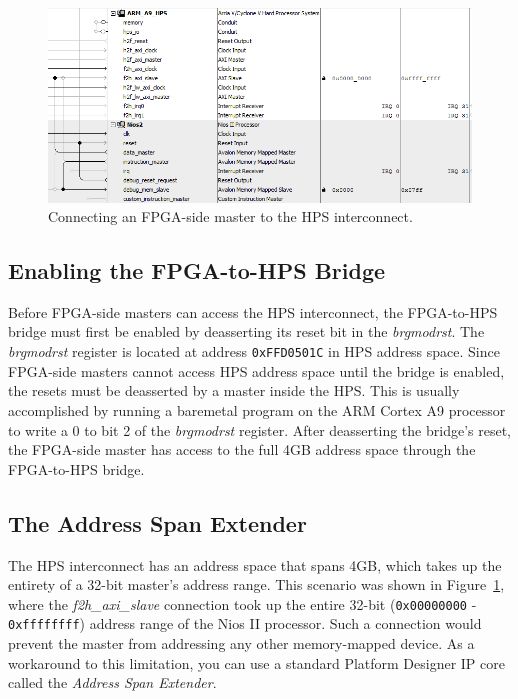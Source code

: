 \documentclass[11pt, twoside, pdftex]{article}
\begin{document}
\begin{figure} [H]
\begin{center}
\includegraphics[scale = 0.8]{figures/fig_Nios_to_HPS.png}
\end{center}
\caption{Connecting an FPGA-side master to the HPS interconnect.}
\label{fig:nios_to_hps}
\end{figure}

\subsection{Enabling the FPGA-to-HPS Bridge}

Before FPGA-side masters can access the HPS interconnect, the FPGA-to-HPS bridge must first be enabled by deasserting its reset bit in the \textit{brgmodrst}. The \textit{brgmodrst} register is located at address \texttt{0xFFD0501C} in HPS address space. Since FPGA-side masters cannot access HPS address space until the bridge is enabled, the resets must be deasserted by a master inside the HPS. This is usually accomplished by running a baremetal program on the ARM Cortex A9 processor to write a 0 to bit 2 of the \textit{brgmodrst} register. After deasserting the bridge's reset, the FPGA-side master has access to the full 4GB address space through the FPGA-to-HPS bridge. 

\subsection{The Address Span Extender}

The HPS interconnect has an address space that spans 4GB, which takes up the entirety of a 32-bit master's address range. This scenario was shown in Figure~\ref{fig:nios_to_hps}, where the \textit{f2h\_axi\_slave} connection took up the entire 32-bit (\texttt{0x00000000} - \texttt{0xffffffff}) address range of the Nios II processor. Such a connection would prevent the master from addressing any other memory-mapped device. As a workaround to this limitation, you can use a standard Platform Designer IP core called the \textit{Address Span Extender}.
\end{document}
